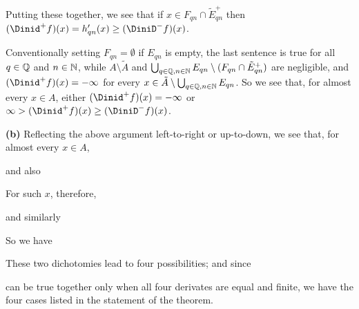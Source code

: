 {\noindent Putting these together, we see that if 
$x\in F_{qn}\cap\tilde E_{qn}^+$ then
$(\Dinid^+f)(x)=h'_{qn}(x)\ge(\DiniD^-f)(x)$.

Conventionally setting $F_{qn}=\emptyset$ if $E_{qn}$ is empty, the last
sentence is true for all $q\in\Bbb Q$ and $n\in\Bbb N$, while
$A\setminus\tilde A$ and
$\bigcup_{q\in\Bbb Q,n\in\Bbb N}E_{qn}\setminus(F_{qn}\cap\tilde E_{qn}^+)$
are negligible, and $(\Dinid^+f)(x)=-\infty$ for every
$x\in\tilde A\setminus\bigcup_{q\in\Bbb Q,n\in\Bbb N}E_{qn}$.   So we see
that, for almost every $x\in A$, either $(\Dinid^+f)(x)=-\infty$ or
$\infty>(\Dinid^+f)(x)\ge(\DiniD^-f)(x)$.

\medskip

{\bf (b)} Reflecting the above argument left-to-right or up-to-down, we see
that, for almost every $x\in A$,




\noindent and also


\noindent For such $x$, therefore,


\noindent and similarly




\noindent So we have



\noindent These two dichotomies lead to four possibilities;  and since 


\noindent can be true together only when all four derivates are equal and
finite, we have the four cases listed in the statement of the theorem.
}%


